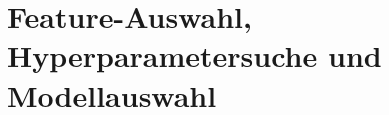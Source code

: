 \section{Feature-Auswahl, Hyperparametersuche und Modellauswahl} \label{sec:Ergeb FeatSel,Hyp,ModSel}